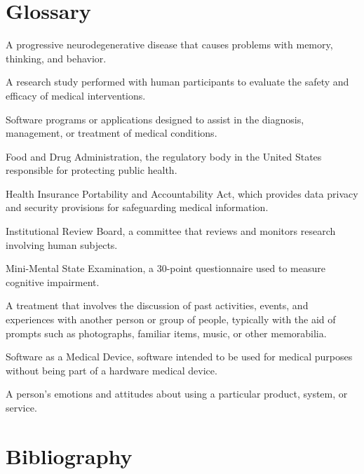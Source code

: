 \documentclass[12pt,a4paper]{book}
\begin{document}
\chapter{Glossary}
\begin{description}[style=nextline]
\item[Alzheimer's Disease (AD)] A progressive neurodegenerative disease that causes problems with memory, thinking, and behavior.
\item[Clinical Trial] A research study performed with human participants to evaluate the safety and efficacy of medical interventions.
\item[Digital Health Application] Software programs or applications designed to assist in the diagnosis, management, or treatment of medical conditions.
\item[FDA] Food and Drug Administration, the regulatory body in the United States responsible for protecting public health.
\item[HIPAA] Health Insurance Portability and Accountability Act, which provides data privacy and security provisions for safeguarding medical information.
\item[IRB] Institutional Review Board, a committee that reviews and monitors research involving human subjects.
\item[MMSE] Mini-Mental State Examination, a 30-point questionnaire used to measure cognitive impairment.
\item[Reminiscence Therapy] A treatment that involves the discussion of past activities, events, and experiences with another person or group of people, typically with the aid of prompts such as photographs, familiar items, music, or other memorabilia.
\item[SaMD] Software as a Medical Device, software intended to be used for medical purposes without being part of a hardware medical device.
\item[User Experience (UX)] A person's emotions and attitudes about using a particular product, system, or service.
\end{description}

\chapter{Bibliography}
\printbibliography[heading=none]

\begin{appendices}




\end{appendices}
\end{document}
